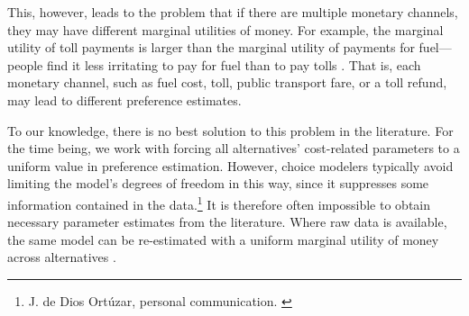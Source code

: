 This, however, leads to the problem that if there are multiple monetary channels, they may have different marginal utilities of money.  For example, the marginal utility of toll payments is larger than the marginal utility of payments for fuel---\ie people find it less irritating to pay for fuel than to pay tolls 
%
%
\citep[see, e.g.,][]{VrticEtc2008ReisekostenSVIBericht}.
%
That is, each monetary channel, such as fuel cost, toll, public transport fare, or a toll refund, may lead to different preference estimates.

To our knowledge, there is no best solution to this problem in the literature.  For the time being, we work with forcing all alternatives' cost-related parameters to a uniform value in preference estimation.
%
However, choice modelers typically avoid limiting the model's degrees of freedom in this way, since it suppresses some information contained in the data.\footnote{%
%
J. de Dios Ort\'uzar, personal communication.
%
\label{fn:ortuzar-pers-com}}
%
It is therefore often impossible to obtain necessary parameter estimates from the literature. Where raw data is available, the same model can be re-estimated with a uniform marginal utility of money across alternatives
\citep[see, e.g.,][]{KickhoeferEtAl2011PolicyEvaluationIncome, TirachiniHensherRose_TransResB_2014}.

